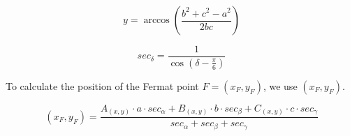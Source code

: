 \begin{equation}
    \label{eqn:calculate_angle}
    y = \arccos{\left(\frac{b^2 + c^2 - a^2}{2bc}\right)}
\end{equation}

\begin{equation}
    \label{eqn:calculation_secant}
    sec_{\delta} = \frac{1}{\cos \left(\delta - \frac{\pi}{6}\right)}
\end{equation}

To calculate the position of the Fermat point $F = (x_F, y_F)$, we use $(x_F,y_F)$.

\begin{equation}
    \label{eqn:fermat_position_x}
    (x_F,y_F) = \frac{A_{(x,y)} \cdot a \cdot sec_{\alpha} + B_{(x,y)} \cdot b \cdot sec_{\beta} + C_{(x,y)} \cdot c \cdot sec_{\gamma}}{sec_{\alpha} + sec_{\beta} + sec_{\gamma}}
\end{equation}
